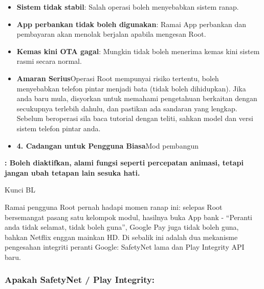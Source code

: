 \begin{itemize}
  \item \textbf{Sistem tidak stabil}: Salah operasi boleh menyebabkan sistem ranap.
  \item \textbf{App perbankan tidak boleh digunakan}: Ramai App perbankan dan pembayaran akan menolak berjalan apabila mengesan Root.
  \item \textbf{Kemas kini OTA gagal}: Mungkin tidak boleh menerima kemas kini sistem rasmi secara normal.
  \item \textbf{Amaran Serius}Operasi Root mempunyai risiko tertentu, boleh menyebabkan telefon pintar menjadi bata (tidak boleh dihidupkan). Jika anda baru mula, disyorkan untuk memahami pengetahuan berkaitan dengan secukupnya terlebih dahulu, dan pastikan ada sandaran yang lengkap. Sebelum beroperasi sila baca tutorial dengan teliti, sahkan model dan versi sistem telefon pintar anda.
  \item \textbf{4. Cadangan untuk Pengguna Biasa}Mod pembangun
\end{itemize}

\textbf{: Boleh diaktifkan, alami fungsi seperti percepatan animasi, tetapi jangan ubah tetapan lain sesuka hati.}\par

Kunci BL


Ramai pengguna Root pernah hadapi momen ranap ini: selepas Root bersemangat pasang satu kelompok modul, hasilnya buka App bank - “Peranti anda tidak selamat, tidak boleh guna”, Google Pay juga tidak boleh guna, bahkan Netflix enggan mainkan HD. Di sebalik ini adalah dua mekanisme pengesahan integriti peranti Google: SafetyNet lama dan Play Integrity API baru.

\subsubsection*{Apakah SafetyNet / Play Integrity:}

